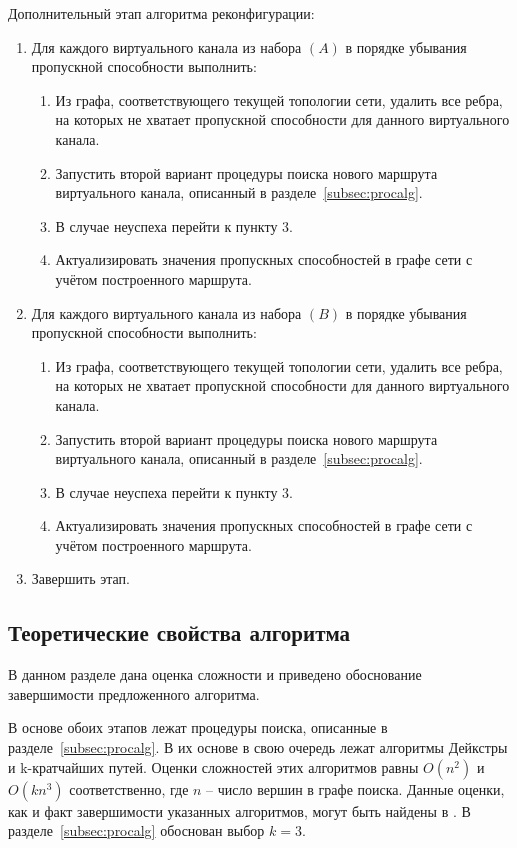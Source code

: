 \documentclass[12pt, a4paper]{article}
\begin{document}
Дополнительный этап алгоритма реконфигурации:
\begin{enumerate}
	\item Для каждого виртуального канала из набора $(A)$ в порядке убывания пропускной способности выполнить:
	\begin{enumerate}
		\item Из графа, соответствующего текущей топологии сети, удалить все ребра, на которых не хватает пропускной способности для данного виртуального канала.
		\item Запустить второй вариант процедуры поиска нового маршрута виртуального канала, описанный в разделе~\ref{subsec:procalg}.
		\item В случае неуспеха перейти к пункту 3.
		\item Актуализировать значения пропускных способностей в графе сети с учётом построенного маршрута.
	\end{enumerate}
	\item Для каждого виртуального канала из набора $(B)$ в порядке убывания пропускной способности выполнить:
	\begin{enumerate}
		\item Из графа, соответствующего текущей топологии сети, удалить все ребра, на которых не хватает пропускной способности для данного виртуального канала.
		\item Запустить второй вариант процедуры поиска нового маршрута виртуального канала, описанный в разделе~\ref{subsec:procalg}.
		\item В случае неуспеха перейти к пункту 3.
		\item Актуализировать значения пропускных способностей в графе сети с учётом построенного маршрута.
	\end{enumerate}
	\item Завершить этап.
\end{enumerate}

\subsection{Теоретические свойства алгоритма}

В данном разделе дана оценка сложности и приведено обоснование завершимости предложенного алгоритма.

В основе обоих этапов лежат процедуры поиска, описанные в разделе~\ref{subsec:procalg}. В их основе в свою очередь лежат алгоритмы Дейкстры и k-кратчайших путей. Оценки сложностей этих алгоритмов равны $O(n^2)$ и $O(kn^3)$ соответственно, где $n$ -- число вершин в графе поиска. Данные оценки, как и факт завершимости указанных алгоритмов, могут быть найдены в \cite{dejkstra, kshort}. В разделе~\ref{subsec:procalg} обоснован выбор $k=3$. 
\end{document}
